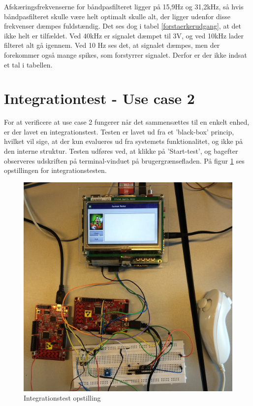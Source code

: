 Afskæringsfrekvenserne for båndpasfilteret ligger på 15,9Hz og 31,2kHz, så hvis båndpasfilteret skulle være helt optimalt skulle alt, der ligger udenfor disse frekvenser dæmpes fuldstændig. Det ses dog i tabel \ref{forstaerkerudgang}, at det ikke helt er tilfældet. Ved 40kHz er signalet dæmpet til 3V, og ved 10kHz lader filteret alt gå igennem. Ved 10 Hz ses det, at signalet dæmpes, men der forekommer også mange spikes, som forstyrrer signalet. Derfor er der ikke indsat et tal i tabellen. 

\section{Integrationtest - Use case 2}
For at verificere at use case 2 fungerer når det sammensættes til en enkelt enhed, er der lavet en integrationstest. Testen er lavet ud fra et 'black-box' princip, hvilket vil sige, at der kun evalueres ud fra systemets funktionalitet, og ikke på den interne struktur.
Testen udføres ved, at klikke på 'Start-test', og bagefter observeres udskriften på terminal-vinduet på brugergrænsefladen. På figur \ref{figure:IntegrationstestOpstilling} ses opstillingen for integrationstesten.

\begin{figure}[H]
	\includegraphics[width=\textwidth]{Test/images/IntegrationstestProtokoller/opstilling}
	\caption{Integrationstest opstilling}
	\label{figure:IntegrationstestOpstilling}
\end{figure}

